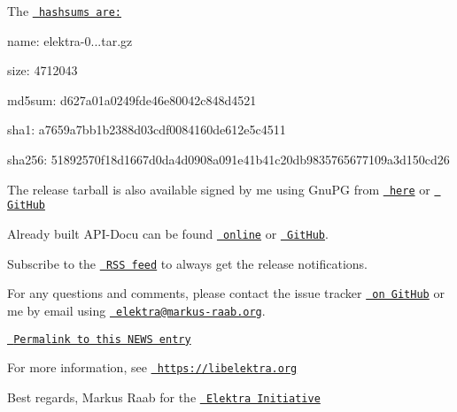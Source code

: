 The \href{https://github.com/ElektraInitiative/ftp/blob/master/releases/elektra-0.8.21.tar.gz.hashsum?raw=true}{\texttt{ hashsums are\+:}}


\begin{DoxyItemize}
\item name\+: elektra-\/0...\+tar.\+gz
\item size\+: 4712043
\item md5sum\+: d627a01a0249fde46e80042c848d4521
\item sha1\+: a7659a7bb1b2388d03cdf0084160de612e5c4511
\item sha256\+: 51892570f18d1667d0da4d0908a091e41b41c20db9835765677109a3d150cd26
\end{DoxyItemize}

The release tarball is also available signed by me using Gnu\+PG from \href{https://www.libelektra.org/ftp/elektra/releases/elektra-0.8.21.tar.gz.gpg}{\texttt{ here}} or \href{https://github.com/ElektraInitiative/ftp/blob/master/releases//elektra-0.8.21.tar.gz.gpg?raw=true}{\texttt{ Git\+Hub}}

Already built A\+P\+I-\/\+Docu can be found \href{https://doc.libelektra.org/api/0.8.21/html/}{\texttt{ online}} or \href{https://github.com/ElektraInitiative/doc/tree/master/api/0.8.21}{\texttt{ Git\+Hub}}.

Subscribe to the \href{https://www.libelektra.org/news/feed.rss}{\texttt{ R\+SS feed}} to always get the release notifications.

For any questions and comments, please contact the issue tracker \href{http://issues.libelektra.org}{\texttt{ on Git\+Hub}} or me by email using \href{mailto:elektra@markus-raab.org}{\texttt{ elektra@markus-\/raab.\+org}}.

\href{https://www.libelektra.org/news/0.8.21-release}{\texttt{ Permalink to this N\+E\+WS entry}}

For more information, see \href{https://libelektra.org}{\texttt{ https\+://libelektra.\+org}}

Best regards, Markus Raab for the \href{https://www.libelektra.org/developers/authors}{\texttt{ Elektra Initiative}} 